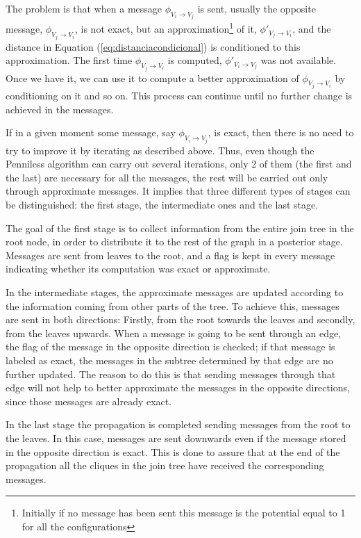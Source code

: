 The problem is that when a message $\phi_{V_i \rightarrow V_j}$ is
sent, usually the opposite message, $\phi_{V_j \rightarrow V_i}$,
is not exact, but an approximation\footnote{Initially if no
  message has been sent this message is the potential equal to 1 for
  all the configurations} of it, $\phi'_{V_j \rightarrow V_i}$, and
the distance in Equation (\ref{eq:distanciacondicional}) is
conditioned to this approximation. The first time $\phi_{V_j
  \rightarrow V_i}$ is computed,  $\phi'_{V_i \rightarrow V_j}$ was
not available. Once we have it, we can use it to compute a better
approximation of $\phi_{V_j \rightarrow V_i}$ by conditioning on
it and so on. This process can continue until no further change is
achieved in the messages.

If in a given moment some message, say $\phi_{V_i \rightarrow
  V_j}$, is exact, then there is no need to try to improve it by
iterating as described above. Thus, even though the Penniless
algorithm can carry out several iterations, only 2 of them (the
first and the last) are necessary for all the messages, the rest
will be carried out only through approximate messages. It implies
that three different types of stages can be distinguished: the
first stage, the intermediate ones and the last stage.

The goal of the first stage is to collect information from the
entire join tree in the root node, in order to distribute it to
the rest of the graph in a posterior stage. Messages are sent from
leaves to the root, and a flag is kept in every message indicating
whether its computation was exact or approximate.

In the intermediate stages, the approximate messages are updated
according to the information coming from other parts of the tree.
To achieve this, messages are sent in both directions: Firstly,
from the root towards the leaves and secondly, from the leaves
upwards. When a message is going to be sent through an edge, the
flag of the message in the opposite direction is checked; if that
message is labeled as exact, the messages in the subtree
determined by that edge are no further updated. The reason to do
this is that sending messages through that edge will not help to
better approximate the messages in the opposite directions, since
those messages are already exact.

In the last stage the propagation is completed sending messages
from the root to the leaves. In this case, messages are sent
downwards even if the message stored in the opposite direction is
exact. This is done to assure that at the end of the propagation
all the cliques in the join tree have received the corresponding
messages.

